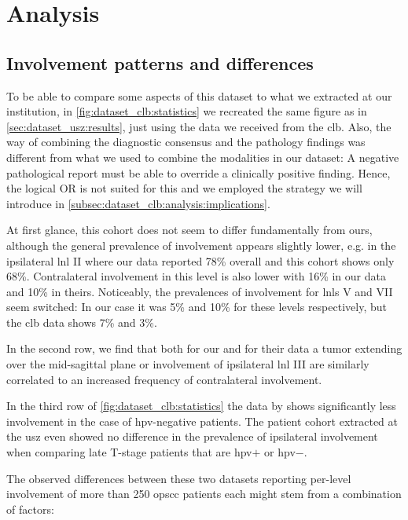 \documentclass[\relativeRoot/main.tex]{subfiles}
\begin{document}
\section{Analysis}
\label{sec:dataset_clb:analysis}

\subsection{Involvement patterns and differences}
\label{subsec:dataset_clb:analysis:patterns}

To be able to compare some aspects of this dataset to what we extracted at our institution, in \cref{fig:dataset_clb:statistics} we recreated the same figure as in \cref{sec:dataset_usz:results}, just using the data we received from the \acrlong{clb}. Also, the way of combining the diagnostic consensus and the pathology findings was different from what we used to combine the modalities in our dataset: A negative pathological report must be able to override a clinically positive finding. Hence, the logical OR is not suited for this and we employed the strategy we will introduce in \cref{subsec:dataset_clb:analysis:implications}.

At first glance, this cohort does not seem to differ fundamentally from ours, although the general prevalence of involvement appears slightly lower, e.g. in the ipsilateral \gls{lnl} II where our data reported 78\% overall and this cohort shows only 68\%. Contralateral involvement in this level is also lower with 16\% in our data and 10\% in theirs. Noticeably, the prevalences of involvement for \glspl{lnl} V and VII seem switched: In our case it was 5\% and 10\% for these levels respectively, but the \gls{clb} data shows 7\% and 3\%.

In the second row, we find that both for our and for their data a tumor extending over the mid-sagittal plane or involvement of ipsilateral \gls{lnl} III are similarly correlated to an increased frequency of contralateral involvement.

In the third row of \cref{fig:dataset_clb:statistics} the data by  shows significantly less involvement in the case of \gls{hpv}-negative patients. The patient cohort extracted at the \gls{usz} even showed no difference in the prevalence of ipsilateral involvement when comparing late T-stage patients that are \gls{hpv}$+$ or \gls{hpv}$-$.

The observed differences between these two datasets reporting per-level involvement of more than 250 \gls{opscc} patients each might stem from a combination of factors:
\end{document}
